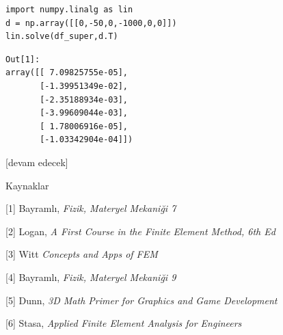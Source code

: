 \documentclass[12pt,fleqn]{article}\usepackage{../../common}
\begin{document}
\begin{verbatim}
import numpy.linalg as lin
d = np.array([[0,-50,0,-1000,0,0]])
lin.solve(df_super,d.T)
\end{verbatim}

\begin{verbatim}
Out[1]: 
array([[ 7.09825755e-05],
       [-1.39951349e-02],
       [-2.35188934e-03],
       [-3.99609044e-03],
       [ 1.78006916e-05],
       [-1.03342904e-04]])
\end{verbatim}
  
[devam edecek]

Kaynaklar

[1] Bayramlı, {\em Fizik, Materyel Mekaniği 7}

[2] Logan, {\em A First Course in the Finite Element Method, 6th Ed}

[3] Witt {\em Concepts and Apps of FEM}

[4] Bayramlı, {\em Fizik, Materyel Mekaniği 9}

[5] Dunn, {\em 3D Math Primer for Graphics and Game Development}

[6] Stasa, {\em Applied Finite Element Analysis for Engineers}
\end{document}
